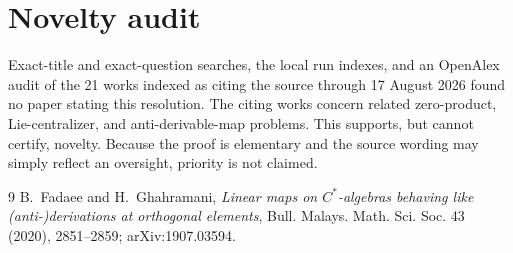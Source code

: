 \documentclass[11pt]{article}
\begin{document}
\section{Novelty audit}

Exact-title and exact-question searches, the local run indexes, and an
OpenAlex audit of the 21 works indexed as citing the source through
17 August 2026 found no paper stating this resolution.  The citing works
concern related zero-product, Lie-centralizer, and anti-derivable-map
problems.  This supports, but cannot certify, novelty.  Because the proof is
elementary and the source wording may simply reflect an oversight, priority
is not claimed.

\begin{thebibliography}{9}
B.~Fadaee and H.~Ghahramani,
\emph{Linear maps on $C^*$-algebras behaving like (anti-)derivations at
orthogonal elements}, Bull. Malays. Math. Sci. Soc. 43 (2020), 2851--2859;
arXiv:1907.03594.
\end{thebibliography}
\end{document}
